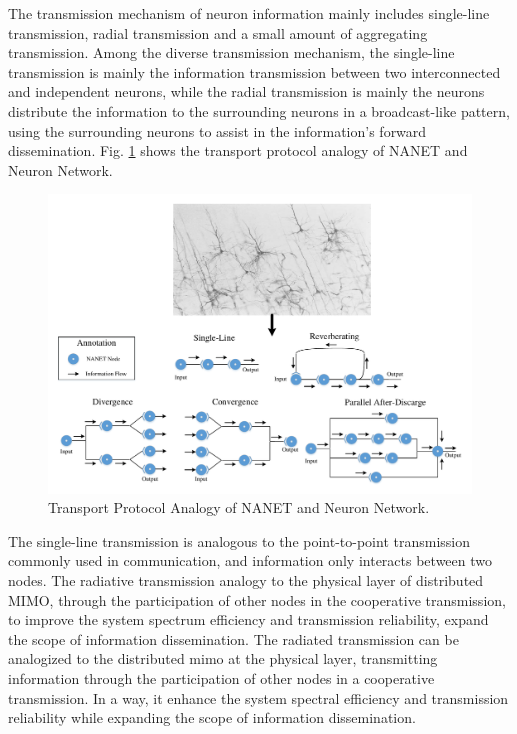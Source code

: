 \documentclass[journal,comsoc]{IEEEtran}
\begin{document}
				The transmission mechanism of neuron information mainly includes single-line transmission, radial transmission and a small amount of aggregating transmission.
				Among the diverse transmission mechanism, the single-line transmission is mainly the information transmission between two interconnected and independent neurons, while the radial transmission is mainly the neurons distribute the information to the surrounding neurons in a broadcast-like pattern, using the surrounding neurons to assist in the information's forward dissemination.
				Fig. \ref{fig: transport_pro} shows the transport protocol analogy of NANET and Neuron Network.
				\begin{figure}[htbp]
					\centering
					\includegraphics[width=0.9\linewidth]{figures/tran_protocol.pdf}
					\caption{Transport Protocol Analogy of NANET and Neuron Network.}	
					\label{fig: transport_pro}
				\end{figure}
				
				The single-line transmission is analogous to the point-to-point transmission commonly used in communication, and information only interacts between two nodes.
				The radiative transmission analogy to the physical layer of distributed MIMO, through the participation of other nodes in the cooperative transmission, to improve the system spectrum efficiency and transmission reliability, expand the scope of information dissemination.
				The radiated transmission can be analogized to the distributed mimo at the physical layer, transmitting information through the participation of other nodes in a cooperative transmission.
				In a way, it enhance the system spectral efficiency and transmission reliability while expanding the scope of information dissemination.
				
\end{document}
